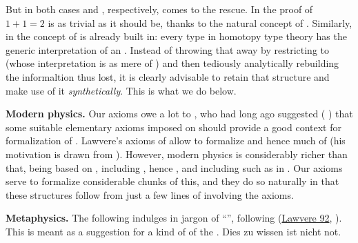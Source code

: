 \documentclass[12pt,titlepage]{article}
\theoremstyle{plain}
\theoremstyle{definition}
\theoremstyle{remark}
\begin{document}
But in both cases  and , respectively, comes to the rescue. In  the proof of $1+1 = 2$ is as trivial as it should be, thanks to the natural concept of . Similarly, in  the concept of  is already built in: every type in homotopy type theory has the generic interpretation of an . Instead of throwing that away by restricting to  (whose interpretation is as mere  of ) and then tediously analytically rebuilding the informaltion thus lost, it is clearly advisable to retain that structure and make use of it \emph{synthetically}. This is what we do below.

\textbf{Modern physics.} Our axioms owe a lot to , who had long ago suggested ( \emph{} ) that some suitable elementary axioms imposed on  should provide a good context for formalization of . Lawvere's axioms of  allow to formalize  and hence much of  (his motivation is drawn from ). However, modern physics is considerably richer than that, being based on    , including , hence , and including  such as  in . Our axioms serve to formalize considerable chunks of this, and they do so naturally in that these structures follow from just a few lines of  involving the axioms.

\textbf{Metaphysics.} The following indulges in  jargon of ``'', following (\href{http://ncatlab.org/nlab/show/objective+and+subjective+logic#Lawvere92}{Lawvere 92}, ). This is meant as a suggestion for a kind of  of the . Dies zu wissen ist nicht not.
\end{document}
